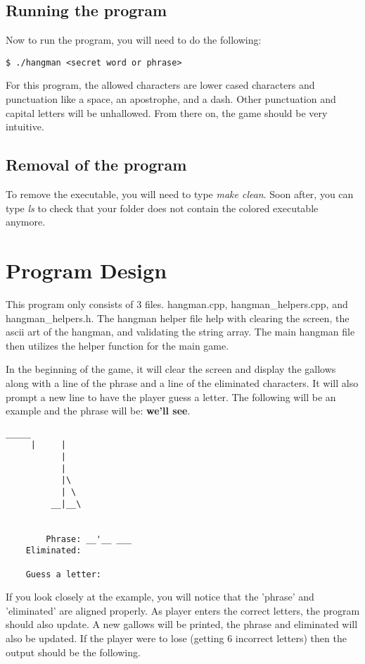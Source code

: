\documentclass{article}
\begin{document}
\subsection{Running the program}

Now to run the program, you will need to do the following:

\begin{Verbatim}[frame=single]
    $ ./hangman <secret word or phrase>
\end{Verbatim}

For this program, the allowed characters are lower cased characters and punctuation like a space, an apostrophe, and a dash. Other punctuation and capital letters will be unhallowed. From there on, the game should be very intuitive.

\subsection{Removal of the program}

To remove the executable, you will need to type \textit{make clean}. Soon after, you can type \textit{ls} to check that your folder does not contain the colored executable anymore.

\section{Program Design}

This program only consists of 3 files. hangman.cpp, hangman\_helpers.cpp, and hangman\_helpers.h. The hangman helper file help with clearing the screen, the ascii art of the hangman, and validating the string array. The main hangman file then utilizes the helper function for the main game. 

In the beginning of the game, it will clear the screen and display the gallows along with a line of the phrase and a line of the eliminated characters. It will also prompt a new line to have the player guess a letter. The following will be an example and the phrase will be: \textbf{we'll see}.

\begin{Verbatim}[frame=single]
      _____
     |     |
           |
           |
           |\
           | \
         __|__\


        Phrase: __'__ ___
    Eliminated:
    
    Guess a letter:
\end{Verbatim}
If you look closely at the example, you will notice that the 'phrase' and 'eliminated' are aligned properly. As player enters the correct letters, the program should also update. A new gallows will be printed, the phrase and eliminated will also be updated. If the player were to lose (getting 6 incorrect letters) then the output should be the following.
\end{document}
